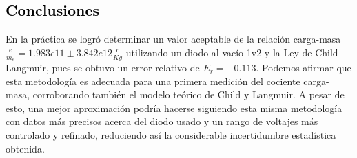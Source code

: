 \textcolor{black}{\section{Conclusiones}}

\noindent
En la práctica se logró determinar un valor aceptable de la relación carga-masa $\frac{e}{m_e} = 1.983e11 \pm 3.842e12 \frac{c}{Kg}$ utilizando un diodo al vacío 1v2 y la Ley de Child-Langmuir, pues se obtuvo un error relativo de $ E_r = -0.113$. Podemos afirmar que esta metodología es adecuada para una primera medición del cociente carga-masa, corroborando también el modelo teórico de Child y Langmuir. A pesar de esto, una mejor aproximación podría hacerse siguiendo esta misma metodología con datos más precisos acerca del diodo usado y un rango de voltajes más controlado y refinado, reduciendo así la considerable incertidumbre estadística obtenida.


